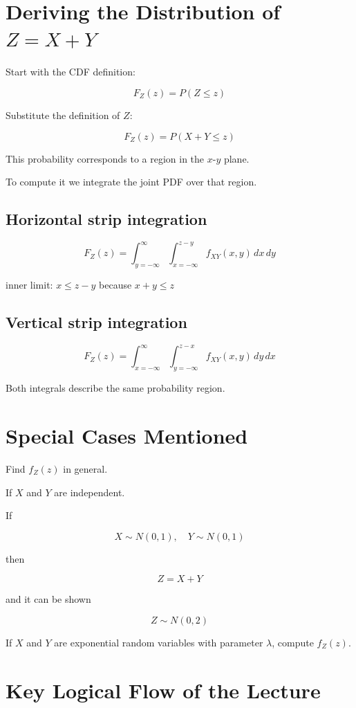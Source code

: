 \documentclass{article}
\begin{document}
\section*{Deriving the Distribution of $Z = X + Y$}

Start with the CDF definition:

\[
F_Z(z) = P(Z \le z)
\]

Substitute the definition of $Z$:

\[
F_Z(z) = P(X + Y \le z)
\]

This probability corresponds to a region in the $x$-$y$ plane.

To compute it we integrate the joint PDF over that region.

\subsection*{Horizontal strip integration}

\[
F_Z(z)=\int_{y=-\infty}^{\infty}\int_{x=-\infty}^{z-y}f_{XY}(x,y)\,dx\,dy
\]

inner limit: $x \le z-y$ because $x+y \le z$

\subsection*{Vertical strip integration}

\[
F_Z(z)=\int_{x=-\infty}^{\infty}\int_{y=-\infty}^{z-x}f_{XY}(x,y)\,dy\,dx
\]

Both integrals describe the same probability region.

\section*{Special Cases Mentioned}

Find $f_Z(z)$ in general.

If $X$ and $Y$ are independent.

If

\[
X \sim N(0,1), \quad Y \sim N(0,1)
\]

then

\[
Z = X + Y
\]

and it can be shown

\[
Z \sim N(0,2)
\]

If $X$ and $Y$ are exponential random variables with parameter $\lambda$, compute $f_Z(z)$.

\section*{Key Logical Flow of the Lecture}
\end{document}

